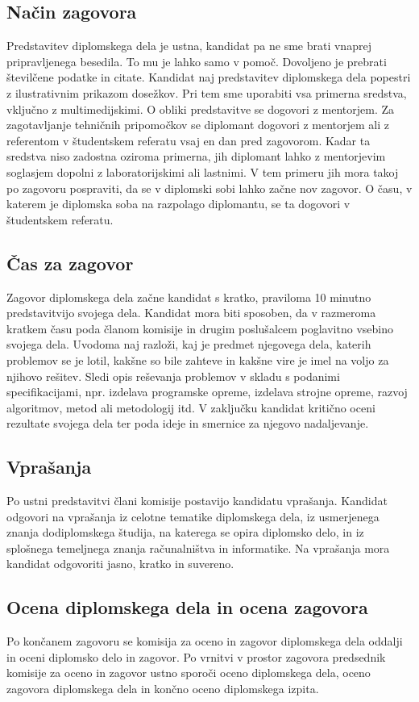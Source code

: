 \documentclass[12pt,a4paper]{book}
\begin{document}
\subsection{Način zagovora}
Predstavitev diplomskega dela je ustna, kandidat pa ne sme brati vna\-prej pripravljenega besedila. To mu je lahko samo v pomoč. Dovoljeno je
pre\-brati številčene podatke in citate. Kandidat naj predstavitev diplomskega dela popestri z ilustrativnim prikazom dosežkov. Pri tem sme
uporabiti vsa primerna sredstva, vključno z multimedijskimi. O obliki predstavitve se dogovori z mentorjem. Za zagotavljanje tehničnih
pripomočkov se diplomant dogovori z mentorjem ali z referentom v štu\-dent\-skem referatu vsaj en dan pred zagovorom. Kadar ta sredstva niso
zadostna oziroma primerna, jih diplomant lahko z mentorjevim soglasjem dopolni z laboratorijskimi ali lastnimi. V tem primeru jih mora takoj po
zagovoru pospraviti, da se v diplomski sobi lahko začne nov zagovor. O času, v katerem je diplomska soba na razpolago diplomantu, se ta
dogovori v študentskem referatu.

\subsection{\v Cas za zagovor}
Zagovor diplomskega dela začne kandidat s kratko, praviloma 10 minutno predstavitvijo svojega dela. Kandidat mora biti sposoben, da v razmeroma
kratkem času poda članom komisije in drugim poslušalcem poglavitno vsebino svojega dela. Uvodoma naj razloži, kaj je predmet njegovega dela,
katerih problemov se je lotil, kakšne so bile zahteve in kakšne vire je imel na voljo za njihovo rešitev. Sledi opis reševanja problemov v
skladu s podanimi specifikacijami, npr. izdelava programske opreme, izdelava strojne opreme, razvoj algoritmov, metod ali metodologij itd. V
zaključku kandidat kritično oceni rezultate svojega dela ter poda ideje in smernice za njegovo nadaljevanje.

\subsection{Vpra\v sanja}
Po ustni predstavitvi člani komisije postavijo kandidatu vprašanja. Kandidat odgovori na vprašanja iz celotne tematike diplomskega dela, iz
usmerjenega znanja dodiplomskega študija, na katerega se opira diplomsko delo, in iz splošnega temeljnega znanja računalništva in informatike.
Na vprašanja mora kandidat odgovoriti jasno, kratko in suvereno.

\subsection{Ocena diplomskega dela in ocena zagovora}
Po končanem zagovoru se komisija za oceno in zagovor diplomskega dela oddalji in oceni diplomsko delo in zagovor. Po vrnitvi v prostor zagovora
predsednik komisije za oceno in zagovor ustno sporoči oceno diplomskega dela, oceno zagovora diplomskega dela in končno oceno diplomskega
izpita. 
\end{document}
